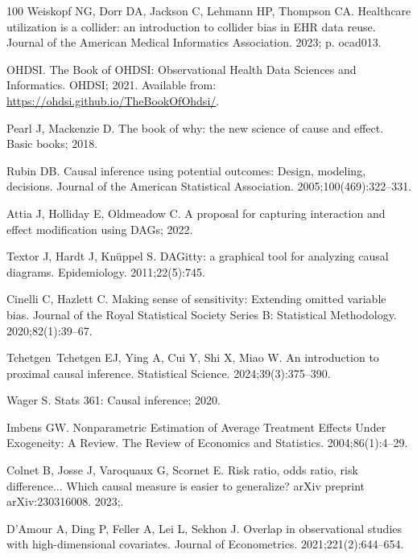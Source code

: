 \documentclass[10pt,letterpaper]{article}
\begin{document}
\begin{thebibliography}{100}
  Weiskopf NG, Dorr DA, Jackson C, Lehmann HP, Thompson CA.
  \newblock Healthcare utilization is a collider: an introduction to collider bias in EHR data reuse.
  \newblock Journal of the American Medical Informatics Association. 2023; p. ocad013.

  OHDSI.
  \newblock The Book of OHDSI: Observational Health Data Sciences and Informatics.
  \newblock OHDSI; 2021.
  \newblock Available from: \url{https://ohdsi.github.io/TheBookOfOhdsi/}.

  Pearl J, Mackenzie D.
  \newblock The book of why: the new science of cause and effect.
  \newblock Basic books; 2018.

  Rubin DB.
  \newblock Causal inference using potential outcomes: Design, modeling, decisions.
  \newblock Journal of the American Statistical Association. 2005;100(469):322--331.

  Attia J, Holliday E, Oldmeadow C. A proposal for capturing interaction and effect modification using DAGs; 2022.

  Textor J, Hardt J, Kn{\"u}ppel S.
  \newblock DAGitty: a graphical tool for analyzing causal diagrams.
  \newblock Epidemiology. 2011;22(5):745.

  Cinelli C, Hazlett C.
  \newblock Making sense of sensitivity: Extending omitted variable bias.
  \newblock Journal of the Royal Statistical Society Series B: Statistical Methodology. 2020;82(1):39--67.

  Tchetgen~Tchetgen EJ, Ying A, Cui Y, Shi X, Miao W.
  \newblock An introduction to proximal causal inference.
  \newblock Statistical Science. 2024;39(3):375--390.

  Wager S. Stats 361: Causal inference; 2020.

  Imbens GW.
  \newblock Nonparametric {Estimation} of {Average} {Treatment} {Effects} {Under} {Exogeneity}: {A} {Review}.
  \newblock The Review of Economics and Statistics. 2004;86(1):4--29.

  Colnet B, Josse J, Varoquaux G, Scornet E.
  \newblock Risk ratio, odds ratio, risk difference... Which causal measure is easier to generalize?
  \newblock arXiv preprint arXiv:230316008. 2023;.

  D'Amour A, Ding P, Feller A, Lei L, Sekhon J.
  \newblock Overlap in observational studies with high-dimensional covariates.
  \newblock Journal of Econometrics. 2021;221(2):644--654.


\end{thebibliography}
\end{document}
